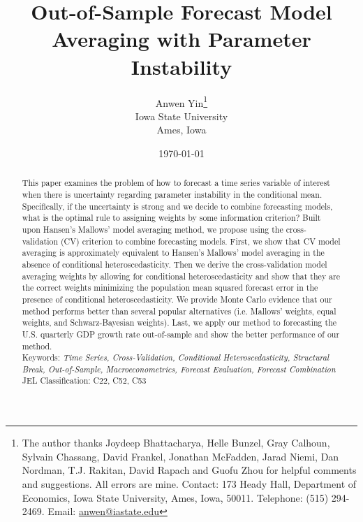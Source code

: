 \newtheorem{theorem}{Theorem}[section]
\newtheorem{lemma}[theorem]{Lemma}
\newtheorem{proposition}[theorem]{Proposition}
\newtheorem{corollary}[theorem]{Corollary}
\newtheorem{Assumption}{Assumption}

\title{Out-of-Sample Forecast Model Averaging with Parameter Instability}
\author{Anwen Yin\thanks{The author thanks Joydeep Bhattacharya, Helle Bunzel, Gray Calhoun, Sylvain Chassang, David Frankel, Jonathan McFadden, Jarad Niemi, Dan Nordman, T.J. Rakitan, David Rapach and Guofu Zhou for helpful comments and suggestions. All errors are mine. Contact: 173 Heady Hall, Department of Economics, Iowa State University, Ames, Iowa, 50011. Telephone: (515) 294-2469. Email: \href{mailto:anwen@iastate.edu}{anwen@iastate.edu}} \\ Iowa State University\\Ames, Iowa}
\date{\today}

\maketitle

\begin{abstract}
  \noindent This paper examines the problem of how to forecast a time series variable of interest when there is uncertainty regarding parameter instability in the conditional mean. Specifically, if the uncertainty is strong and we decide to combine forecasting models, what is the optimal rule to assigning weights by some information criterion? Built upon Hansen's Mallows' model averaging method, we propose using the cross-validation (CV) criterion to combine forecasting models. First, we show that CV model averaging is approximately equivalent to Hansen's Mallows' model averaging in the absence of conditional heteroscedasticity. Then we derive the cross-validation model averaging weights by allowing for conditional heteroscedasticity and show that they are the correct weights minimizing the population mean squared forecast error in the presence of conditional heteroscedasticity. We provide Monte Carlo evidence that our method performs better than several popular alternatives (i.e. Mallows' weights, equal weights, and Schwarz-Bayesian weights). Last, we apply our method to forecasting the U.S. quarterly GDP growth rate out-of-sample and show the better performance of our method.\\

  \noindent Keywords: \emph{Time Series, Cross-Validation, Conditional Heteroscedasticity, Structural Break, Out-of-Sample, Macroeconometrics, Forecast Evaluation, Forecast Combination}\\

  \noindent \textsc{JEL} Classification: C22, C52, C53
\end{abstract}
\newpage
\doublespacing
